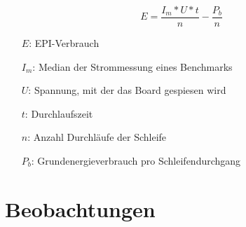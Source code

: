 \begin{minipage}{\textwidth}
\[ E = \frac{I_m * U * t}{n} - \frac{P_b}{n}\]
\hspace{1em}
\begin{itemize}
\itemsep1pt
    \item[$E$:] EPI-Verbrauch
    \item[$I_m$:] Median der Strommessung eines Benchmarks
    \item[$U$:] Spannung, mit der das Board gespiesen wird
    \item[$t$:] Durchlaufszeit
    \item[$n$:] Anzahl Durchläufe der Schleife 
    \item[$P_b$:] Grundenergieverbrauch pro Schleifendurchgang
    
\end{itemize}
\end{minipage}









\section{Beobachtungen}

